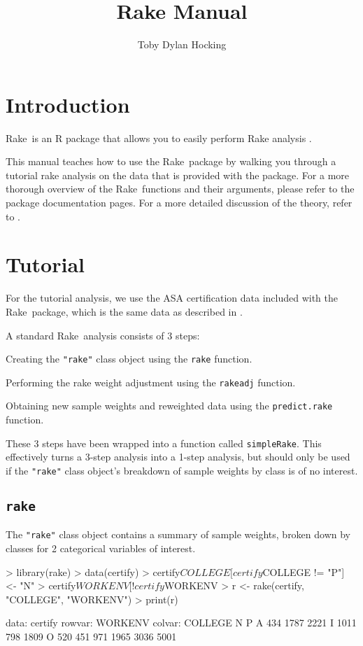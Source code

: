 \documentclass[12pt]{TDH-article}
\begin{document}
\title{Rake Manual}
\author{Toby Dylan Hocking}
\maketitle

\newcommand{\rake}{Rake}

\section{Introduction}
\rake\ is an R package that allows you to easily perform Rake analysis \cite{Lohr:rake}.

This manual teaches how to use the \rake\ package by walking you through a tutorial rake analysis on the data that is provided with the package. For a more thorough overview of the \rake\ functions and their arguments, please refer to the package documentation pages. For a more detailed discussion of the theory, refer to \cite{Lohr:rake}.

\section{Tutorial}
For the tutorial analysis, we use the ASA certification data included
with the \rake\ package, which is the same data as described in
\cite{Lohr:certify}.

A standard \rake\ analysis consists of 3 steps:
\be
\item Creating the {\tt "rake"} class object using the {\tt rake} function.
\item Performing the rake weight adjustment using the {\tt rakeadj} function.
\item Obtaining new sample weights and reweighted data  using the {\tt predict.rake} function.
\ee

These 3 steps have been wrapped into a function called {\tt simpleRake}.
This effectively turns a 3-step analysis into a 1-step analysis, but should
only be used if the {\tt "rake"} class object's breakdown of sample weights by
class is of no interest.

\subsection{{\tt rake}}
The {\tt "rake"} class object contains a summary of sample weights, broken down by classes for 2 categorical variables of interest.

\begin{Schunk}
\begin{Sinput}
> library(rake)
> data(certify)
> certify$COLLEGE[certify$COLLEGE != "P"] <- "N"
> certify$WORKENV[!certify$WORKENV %in% c("I", "A")] <- "O"
> r <- rake(certify, "COLLEGE", "WORKENV")
> print(r)
\end{Sinput}
\begin{Soutput}
  data: certify
rowvar: WORKENV
colvar: COLLEGE
     N    P     
A  434 1787 2221
I 1011  798 1809
O  520  451  971
  1965 3036 5001
\end{Soutput}
\end{Schunk}
\end{document}

